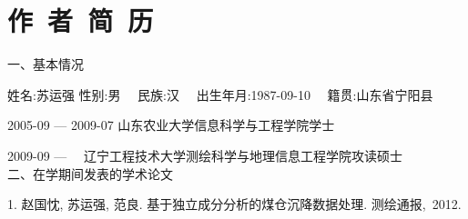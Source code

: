 
%
%

\chapter*{\hfill 作~者~简~历 \hfill}
\renewcommand{\labelenumi}{[\arabic{enumi}]}
一、基本情况

姓名:苏运强 性别:男 ~~民族:汉 ~~出生年月:1987-09-10 ~~籍贯:山东省宁阳县

2005-09 — 2009-07 山东农业大学信息科学与工程学院学士 

2009-09 —         ~~辽宁工程技术大学测绘科学与地理信息工程学院攻读硕士\\

二、在学期间发表的学术论文

1. 赵国忱, 苏运强, 范良. 基于独立成分分析的煤仓沉降数据处理. 测绘通报,~2012.

